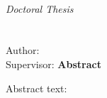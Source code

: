 \thispagestyle{plain}
\vskip1cm
\begin{center}
  \uuniversity\\
  \textit{Doctoral Thesis}\\
  \vskip0.5cm
  \textbf{\ttitle}\\
  \textbf{\ssubtitle}\\
  \vskip0.5cm
  Author: \aauthor\\
  Supervisor: \ssupervisor%
  \vskip1cm
  \textbf{Abstract}
\end{center}

\vskip0.5cm


Abstract text:

\dummytext

